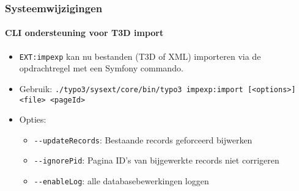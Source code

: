 \begin{frame}[fragile]
	\frametitle{Systeemwijzigingen}
	\framesubtitle{CLI ondersteuning voor T3D import}

	\begin{itemize}
		\item \texttt{EXT:impexp} kan nu bestanden (T3D of XML) importeren via de opdrachtregel
			met een Symfony commando.

		\item Gebruik:\newline
			\smaller
				\texttt{./typo3/sysext/core/bin/typo3 impexp:import [<options>] <file> <pageId>}
			\normalsize

		\item Opties:
			\begin{itemize}
				\item \texttt{-}\texttt{-updateRecords}: Bestaande records geforceerd bijwerken
				\item \texttt{-}\texttt{-ignorePid}: Pagina ID's van bijgewerkte records niet corrigeren
				\item \texttt{-}\texttt{-enableLog}: alle databasebewerkingen loggen
			\end{itemize}

	\end{itemize}

\end{frame}


